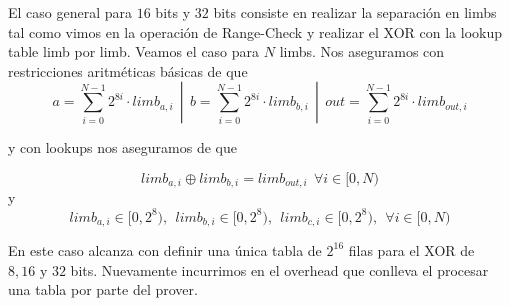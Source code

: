 El caso general para $16$ bits y $32$ bits consiste en realizar la separación en limbs tal como vimos en la operación de Range-Check y realizar el XOR con la lookup table limb por limb. Veamos el caso para $N$ limbs. Nos aseguramos con restricciones aritméticas básicas de que 
$$a = \sum_{i=0}^{N-1} 2^{8i} \cdot limb_{a,i}~~|~~b = \sum_{i=0}^{N-1} 2^{8i} \cdot limb_{b,i}~~|~~out = \sum_{i=0}^{N-1} 2^{8i} \cdot limb_{out,i}$$

y con lookups nos aseguramos de que

$$limb_{a,i}\oplus limb_{b,i} = limb_{out,i}~~\forall i \in [0,N)$$
y
$$limb_{a,i} \in [0,2^8),~~ limb_{b,i} \in [0,2^8),~~limb_{c,i} \in [0,2^8),~~\forall i \in [0,N)$$



En este caso alcanza con definir una única tabla de $2^{16}$ filas para el XOR de $8, 16 \text{ y } 32$ bits. Nuevamente incurrimos en el overhead que conlleva el procesar una tabla por parte del prover.